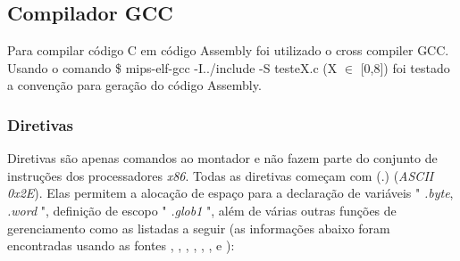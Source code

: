 \documentclass[12pt]{article}
\begin{document}
\subsection{Compilador GCC}
\label{subsec:comp}

Para compilar código C em código Assembly foi utilizado o cross compiler \cite{MIPS} GCC. Usando o comando \$ mips-elf-gcc -I../include -S testeX.c (X $\in$ [0,8]) foi testado a convenção para geração do código Assembly.

\subsubsection{Diretivas}
\label{subsubsec:diretivas}

Diretivas são apenas comandos ao montador e não fazem parte do conjunto de instruções dos processadores \textit{x86}. Todas as diretivas começam com (.) (\textit{ASCII 0x2E}). Elas permitem a alocação de espaço para a declaração de variáveis " \textit{.byte}, \textit{.word} ", definição de escopo " \textit{.glob1} ", além de várias outras funções de gerenciamento como as listadas a seguir (as informações abaixo foram encontradas usando as fontes \cite{mips1}, \cite{mips2-1}, \cite{mips2-2}, \cite{mips2-3}, \cite{mips3}, 
\cite{mips4}, \cite{mips5} e \cite{mips6} ):
\end{document}

